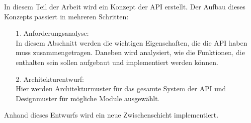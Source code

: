  
In diesem Teil der Arbeit wird ein Konzept der API erstellt.
Der Aufbau dieses Konzepts passiert in mehreren Schritten:
\begin{itemize}
	\item [1.] Anforderungsanalyse: \\In diesem Abschnitt werden die wichtigen Eigenschaften, die die API haben muss zusammengetragen. Daneben wird analysiert, wie die Funktionen, die enthalten sein sollen aufgebaut und implementiert werden können.
	\item [2.] Architekturentwurf: \\Hier werden Architekturmuster für das gesamte System der API und Designmuster für mögliche Module ausgewählt.
\end{itemize}

Anhand dieses Entwurfs wird ein neue Zwischenschicht implementiert.

